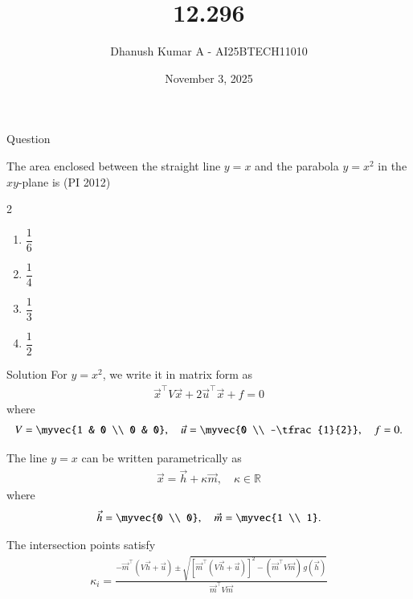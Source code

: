 \documentclass{beamer}
\title 
{12.296}
\date{November 3, 2025}
\author 
{Dhanush Kumar A - AI25BTECH11010}
\begin{document}
\frame{\titlepage}
\begin{frame}{Question}


The area enclosed between the straight line $y = x$ and the parabola $y = x^2$ in the $xy$-plane is (PI 2012)

\begin{multicols}{2}
\begin{enumerate}
\item $\dfrac{1}{6}$
\item $\dfrac{1}{4}$
\item $\dfrac{1}{3}$
\item $\dfrac{1}{2}$
\end{enumerate}
\end{multicols}
\end{frame}
\begin{frame}{Solution}
For $y = x^2$, we write it in matrix form as
\begin{align}
\vec{x}^{\top} V \vec{x} + 2\vec{u}^{\top}\vec{x} + f = 0
\end{align}
where
\begin{align}
V = \myvec{1 & 0 \\ 0 & 0}, \quad 
\vec{u} = \myvec{0 \\ -\tfrac{1}{2}}, \quad 
f = 0.
\end{align}

The line $y = x$ can be written parametrically as
\begin{align}
\vec{x} = \vec{h} + \kappa \vec{m}, \quad \kappa \in \mathbb{R}
\end{align}
where
\begin{align}
\vec{h} = \myvec{0 \\ 0}, \quad 
\vec{m} = \myvec{1 \\ 1}.
\end{align}

The intersection points satisfy
\begin{align}
\kappa_i =
\frac{-\vec{m}^{\top}(V\vec{h} + \vec{u}) 
\pm \sqrt{[\vec{m}^{\top}(V\vec{h} + \vec{u})]^2 
- (\vec{m}^{\top}V\vec{m})\,g(\vec{h})}}
{\vec{m}^{\top}V\vec{m}}
\end{align}
\end{frame}
\end{document}
